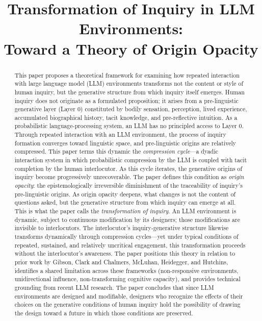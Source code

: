 \documentclass[12pt]{article}
\title{\textbf{Transformation of Inquiry in LLM Environments:\\
Toward a Theory of Origin Opacity}}
\author{}
\date{}
\begin{document}
\maketitle

\begin{abstract}
This paper proposes a theoretical framework for examining how repeated interaction with large language model (LLM) environments transforms not the content or style of human inquiry, but the generative structure from which inquiry itself emerges. Human inquiry does not originate as a formulated proposition; it arises from a pre-linguistic generative layer (Layer 0) constituted by bodily sensation, perception, lived experience, accumulated biographical history, tacit knowledge, and pre-reflective intuition. As a probabilistic language-processing system, an LLM has no principled access to Layer 0. Through repeated interaction with an LLM environment, the process of inquiry formation converges toward linguistic space, and pre-linguistic origins are relatively compressed. This paper terms this dynamic the \emph{compression cycle}---a dyadic interaction system in which probabilistic compression by the LLM is coupled with tacit completion by the human interlocutor. As this cycle iterates, the generative origins of inquiry become progressively unrecoverable. The paper defines this condition as \emph{origin opacity}: the epistemologically irreversible diminishment of the traceability of inquiry's pre-linguistic origins. As origin opacity deepens, what changes is not the content of questions asked, but the generative structure from which inquiry can emerge at all. This is what the paper calls the \emph{transformation of inquiry}. An LLM environment is dynamic, subject to continuous modification by its designers; those modifications are invisible to interlocutors. The interlocutor's inquiry-generative structure likewise transforms dynamically through compression cycles---yet under typical conditions of repeated, sustained, and relatively uncritical engagement, this transformation proceeds without the interlocutor's awareness. The paper positions this theory in relation to prior work by Gibson, Clark and Chalmers, McLuhan, Heidegger, and Hutchins, identifies a shared limitation across these frameworks (non-responsive environments, unidirectional influence, non-transforming cognitive capacity), and provides technical grounding from recent LLM research. The paper concludes that since LLM environments are designed and modifiable, designers who recognize the effects of their choices on the generative conditions of human inquiry hold the possibility of drawing the design toward a future in which those conditions are preserved.
\end{abstract}
\end{document}
